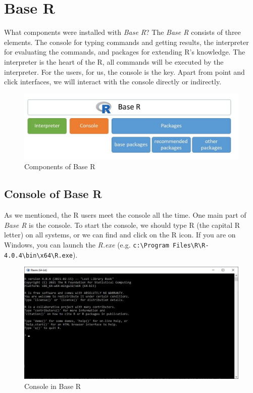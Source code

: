 \documentclass[
]{book}
\begin{document}
\hypertarget{base-r}{%
\section{Base R}\label{base-r}}

What components were installed with \emph{Base R}? The \emph{Base R} consists of
three elements. The console for typing commands and getting results, the
interpreter for evaluating the commands, and packages for extending R's
knowledge. The interpreter is the heart of the R, all commands will be
executed by the interpreter. For the users, for us, the console is the
key. Apart from point and click interfaces, we will interact with the
console directly or indirectly.

\begin{figure}

{\centering \includegraphics[width=0.7\linewidth]{img/baser} 

}

\caption{Components of Base R}\label{fig:unnamed-chunk-5}
\end{figure}

\hypertarget{console-of-base-r}{%
\subsection{Console of Base R}\label{console-of-base-r}}

As we mentioned, the R users meet the console all the time. One main
part of \emph{Base R} is the console. To start the console, we should type R
(the capital R letter) on all systems, or we can find and click on the R
icon. If you are on Windows, you can launch the \emph{R.exe} (e.g.
\texttt{c:\textbackslash{}Program\ Files\textbackslash{}R\textbackslash{}R-4.0.4\textbackslash{}bin\textbackslash{}x64\textbackslash{}R.exe}).

\begin{figure}

{\centering \includegraphics[width=0.7\linewidth]{img/console} 

}

\caption{Console in Base R}\label{fig:unnamed-chunk-6}
\end{figure}
\end{document}

